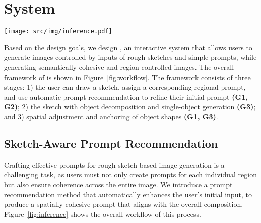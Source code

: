 \section{\tool System}\label{sec:system_description}

\begin{figure*}[t]
    \centering
    \texttt{[image: src/img/inference.pdf]}
    \vspace{-2mm}
    \caption{Our sketch-aware prompt recommendation first builds a semantic space through data-driven analysis of key semantic elements covering single object and cross object properties. Then the semantic space is integrated with retrieval of attributes and relationships reference from semantic dataset. Finally, these semantic guidance is combined with users' initial sketch to form a sketch-aware multi-modal prompt to the MLLM to support spatial-aware inference.}
    \label{fig:inference}
\end{figure*}

Based on the design goals, we design \tool, an interactive system that allows users to generate images controlled by inputs of rough sketches and simple prompts, while generating semantically cohesive and region-controlled images.
The overall framework of \tool is shown in Figure~\ref{fig:workflow}. 
The framework consists of three stages: 1) the user can draw a sketch, assign a corresponding regional prompt, and use automatic prompt recommendation to refine their initial prompt \textbf{(G1, G2)}; 2) the sketch with object decomposition and single-object generation \textbf{(G3)}; and 3) spatial adjustment and anchoring of object shapes   \textbf{(G1, G3)}.


\subsection{Sketch-Aware Prompt Recommendation}
\label{ssec:prompt_rec}
Crafting effective prompts for rough sketch-based image generation is a challenging task, as users must not only create prompts for each individual region but also ensure coherence across the entire image. 
We introduce a prompt recommendation method that automatically enhances the user’s initial input, to produce a spatially cohesive prompt that aligns with the overall composition.
Figure~\ref{fig:inference} shows the overall workflow of this process.


